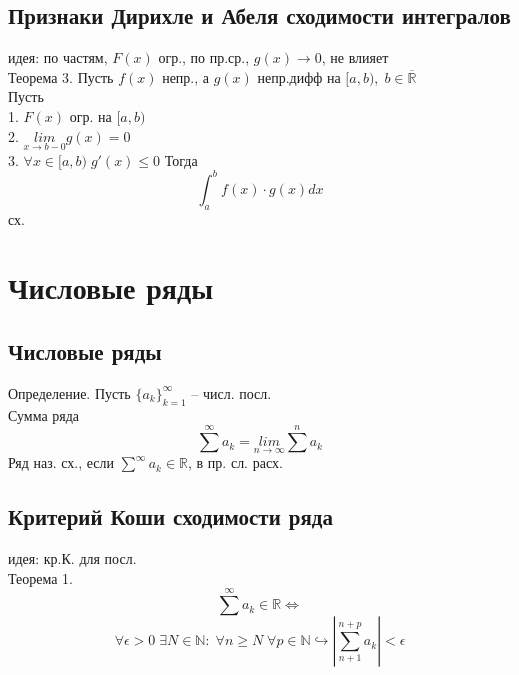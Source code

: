 \documentclass{article}
\begin{document}
\subsection{Признаки Дирихле и Абеля сходимости интегралов}
идея: по частям, $F(x)$ огр., по пр.ср., $g(x) \rightarrow 0$, не влияет \\
Теорема 3. Пусть $f(x)$ непр., а $g(x)$ непр.дифф на $[a,b), \; b \in \overline{\mathbb R}$ \\
Пусть \\
1. $F(x)$ огр. на $[a,b)$ \\
2. $\underset{x \rightarrow b-0}{lim} g(x) = 0$ \\
3. $\forall x \in [a,b) \; g'(x) \leq 0$
Тогда \\
\begin{equation*}
    \int_a^b f(x) \cdot g(x) dx
\end{equation*}
сх. \\


\newpage
\section{Числовые ряды}
\subsection{Числовые ряды}
Определение. Пусть $\{ a_k \}_{k=1}^{\infty}$ -- числ. посл. \\
Сумма ряда
\begin{equation*}
    \sum^\infty a_k = \underset{n \rightarrow \infty}{lim} \sum^n a_k
\end{equation*}
Ряд наз. сх., если $\overset{\infty}{\sum} a_k \in \mathbb R$, в пр. сл. расх.
\subsection{Критерий Коши сходимости ряда}
идея: кр.К. для посл. \\
Теорема 1.
\begin{equation*}
    \overset{\infty}{\sum} a_k \in \mathbb R \Leftrightarrow
\end{equation*}
\begin{equation*}
    \forall \epsilon > 0 \; \exists N \in \mathbb N: \; \forall n \geq N \; \forall p \in \mathbb N \hookrightarrow |\sum_{n+1}^{n+p} a_k| < \epsilon
\end{equation*}
\end{document}
